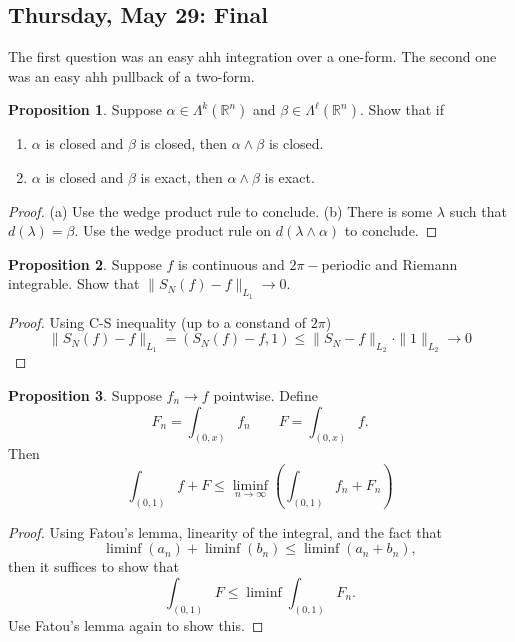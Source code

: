 \documentclass[10pt, oneside]{article}
\newcommand{\bbR}{\mathbb{R}}
\theoremstyle{definition}
\newtheorem{prop}{Proposition}
\begin{document}
\subsection{Thursday, May 29: Final}
The first question was an easy ahh integration over a one-form. The second one was an easy ahh pullback of a two-form.
\begin{prop}
    Suppose $\alpha \in \Lambda^k(\bbR^n)$ and $\beta \in \Lambda^\ell(\bbR^n).$ Show that if 
    \begin{enumerate}
        \item $\alpha$ is closed and $\beta$ is closed, then $\alpha \wedge \beta$ is closed.
        \item $\alpha$ is closed and $\beta$ is exact, then $\alpha \wedge \beta$ is exact. 
    \end{enumerate}
\end{prop}
\begin{proof}
    (a) Use the wedge product rule to conclude.
    (b) There is some $\lambda$ such that $d(\lambda) = \beta.$ Use the wedge product rule on $d(\lambda \wedge \alpha)$ to conclude. 
\end{proof}
\begin{prop}
    Suppose $f$ is continuous and $2\pi-$periodic and Riemann integrable. Show that $\|S_N(f) - f\|_{L_1} \to 0.$
\end{prop}
\begin{proof}
    Using C-S inequality (up to a constand of $2\pi$)
    \[ \|S_N(f) - f\|_{L_1}= (S_N(f) - f, 1) \leq \|S_N - f\|_{L_2}\cdot \|1\|_{L_2} \to 0\]
\end{proof}
\begin{prop}
    Suppose $f_n \to f$ pointwise. Define 
    \[F_n = \int_{(0,x)} f_n \qquad F = \int_{(0,x)} f.\] Then 
    \[\int_{(0,1)} f + F \leq \liminf_{n\to \infty} \left(\int_{(0,1)} f_n+ F_n\right)\]
\end{prop}
\begin{proof}
    Using Fatou's lemma, linearity of the integral, and the fact that 
    \[\liminf (a_n) + \liminf (b_n) \leq \liminf (a_n + b_n),\] then it suffices to show that
    \[\int_{(0,1)} F \leq \liminf \int_{(0,1)} F_n.\] Use Fatou's lemma again to show this.
\end{proof}
\end{document}
